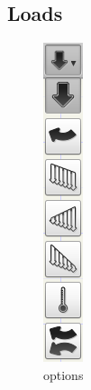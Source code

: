 \documentclass[a4paper,11pt]{report}
\begin{document}
\subsection{Loads}

\begin{minipage}[h]{4cm}
\begin{figure}[H]
\begin{center}
\includegraphics[scale=0.6]{./pictures/load_opt.png}
\caption{options}
\label{pic:load_opt}
\end{center}
\end{figure}
\end{minipage}
\end{document}
